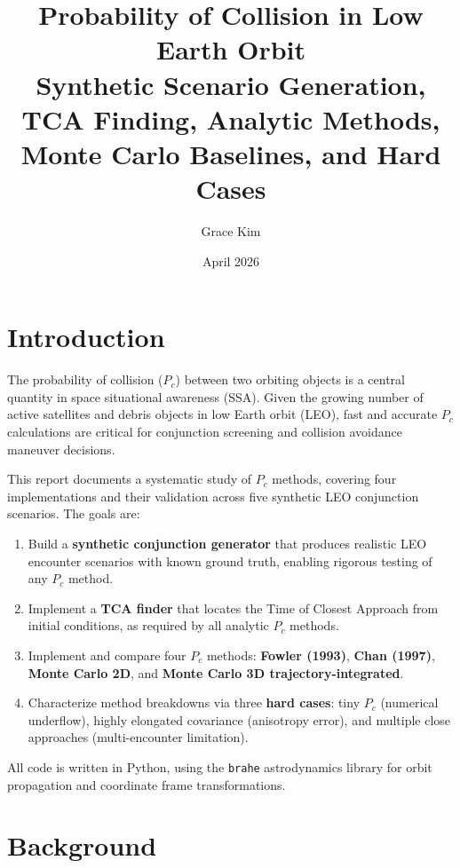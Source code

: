 \documentclass[11pt]{article}
\title{\textbf{Probability of Collision in Low Earth Orbit}\\[0.4em]
       \large Synthetic Scenario Generation, TCA Finding, Analytic Methods,\\
       Monte Carlo Baselines, and Hard Cases}
\author{Grace Kim}
\date{April 2026}
\begin{document}
\maketitle
\tableofcontents
\newpage

\section{Introduction}
\label{sec:intro}

The probability of collision ($P_c$) between two orbiting objects is a central
quantity in space situational awareness (SSA).  Given the growing number of
active satellites and debris objects in low Earth orbit (LEO), fast and accurate
$P_c$ calculations are critical for conjunction screening and collision avoidance
maneuver decisions.

This report documents a systematic study of $P_c$ methods, covering four
implementations and their validation across five synthetic LEO conjunction
scenarios.  The goals are:
\begin{enumerate}
  \item Build a \textbf{synthetic conjunction generator} that produces
        realistic LEO encounter scenarios with known ground truth, enabling
        rigorous testing of any $P_c$ method.
  \item Implement a \textbf{TCA finder} that locates the Time of Closest
        Approach from initial conditions, as required by all analytic $P_c$
        methods.
  \item Implement and compare four $P_c$ methods: \textbf{Fowler (1993)},
        \textbf{Chan (1997)}, \textbf{Monte Carlo 2D}, and
        \textbf{Monte Carlo 3D trajectory-integrated}.
  \item Characterize method breakdowns via three \textbf{hard cases}: tiny
        $P_c$ (numerical underflow), highly elongated covariance (anisotropy
        error), and multiple close approaches (multi-encounter limitation).
\end{enumerate}

All code is written in Python, using the \texttt{brahe} astrodynamics library
for orbit propagation and coordinate frame transformations.

\section{Background}
\label{sec:background}
\end{document}
